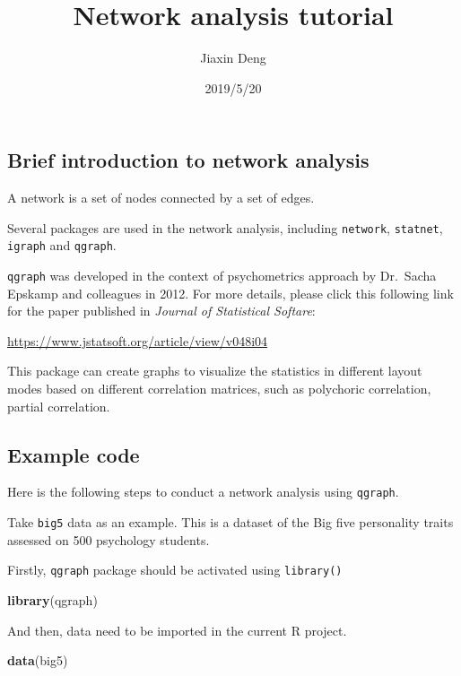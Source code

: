 \documentclass[]{article}
\title{Network analysis tutorial}
\author{Jiaxin Deng}
\date{2019/5/20}
\newenvironment{Shaded}{\begin{snugshade}}{\end{snugshade}}
\newcommand{\KeywordTok}[1]{\textcolor[rgb]{0.13,0.29,0.53}{\textbf{#1}}}
\newcommand{\NormalTok}[1]{#1}
\begin{document}
\maketitle

\subsection{Brief introduction to network
analysis}\label{brief-introduction-to-network-analysis}

A network is a set of nodes connected by a set of edges.

Several packages are used in the network analysis, including
\texttt{network}, \texttt{statnet}, \texttt{igraph} and \texttt{qgraph}.

\texttt{qgraph} was developed in the context of psychometrics approach
by Dr.~Sacha Epskamp and colleagues in 2012. For more details, please
click this following link for the paper published in \emph{Journal of
Statistical Softare}:

\url{https://www.jstatsoft.org/article/view/v048i04}

This package can create graphs to visualize the statistics in different
layout modes based on different correlation matrices, such as polychoric
correlation, partial correlation.

\subsection{Example code}\label{example-code}

Here is the following steps to conduct a network analysis using
\texttt{qgraph}.

Take \texttt{big5} data as an example. This is a dataset of the Big five
personality traits assessed on 500 psychology students.

Firstly, \texttt{qgraph} package should be activated using
\texttt{library()}

\begin{Shaded}
\begin{Highlighting}[]
\KeywordTok{library}\NormalTok{(qgraph)}
\end{Highlighting}
\end{Shaded}

And then, data need to be imported in the current R project.

\begin{Shaded}
\begin{Highlighting}[]
\KeywordTok{data}\NormalTok{(big5)}
\end{Highlighting}
\end{Shaded}
\end{document}
